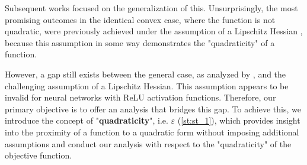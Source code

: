 \vspace{10pt}

Subsequent works focused on the generalization of this. Unsurprisingly, the most promising outcomes in the identical convex case, where the function is not quadratic, were previously achieved under the assumption of a Lipschitz Hessian \citep{FedAC, Spiridonoff}, because this assumption in some way demonstrates the "quadraticity" of a function.

\vspace{10pt}

However, a gap still exists between the general case, as analyzed by \cite{Khaled}, and the challenging assumption of a Lipschitz Hessian. This assumption appears to be invalid for neural networks with ReLU activation functions. Therefore, our primary objective is to offer an analysis that bridges this gap. To achieve this, we introduce the concept of "\textbf{quadraticity}", i.e. $\varepsilon$ (\ref{st:st_1}), which provides insight into the proximity of a function to a quadratic form without imposing additional assumptions and conduct our analysis with respect to the "quadraticity" of the objective function.